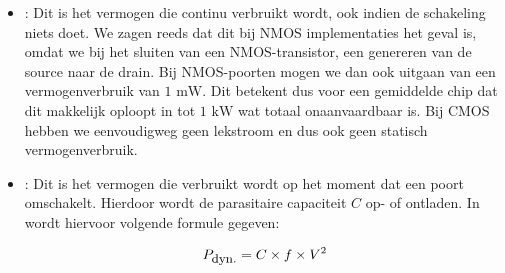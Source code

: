 \begin{itemize}
 \item {}: Dit is het vermogen die continu verbruikt wordt, ook indien de schakeling niets doet. We zagen reeds dat dit bij NMOS implementaties het geval is, omdat we bij het sluiten van een NMOS-transistor, een  genereren van de source naar de drain. Bij NMOS-poorten mogen we dan ook uitgaan van een vermogenverbruik van $1\mbox{ mW}$. Dit betekent dus voor een gemiddelde chip dat dit makkelijk oploopt in tot $1\mbox{ kW}$ wat totaal onaanvaardbaar is. Bij CMOS hebben we eenvoudigweg geen lekstroom en dus ook geen statisch vermogenverbruik.
 \item {}: Dit is het vermogen die verbruikt wordt op het moment dat een poort omschakelt. Hierdoor wordt de parasitaire capaciteit $C$ op- of ontladen. In \cite[3.12]{brown2004fundamentals} wordt hiervoor volgende formule gegeven:

\begin{equation}
P_{\mbox{\small{dyn.}}}=C\times f\times V^2
\end{equation}


\end{itemize}

